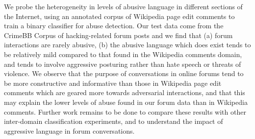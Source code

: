 We probe the heterogeneity in levels of abusive language in different sections of the Internet, using an annotated corpus of Wikipedia page edit comments to train a binary classifier for abuse detection. Our test data come from the CrimeBB Corpus of hacking-related forum posts and we find that (a) forum interactions are rarely abusive, (b) the abusive language which does exist tends to be relatively mild compared to that found in the Wikipedia comments domain, and tends to involve aggressive posturing rather than hate speech or threats of violence. We observe that the purpose of conversations in online forums tend to be more constructive and informative than those in Wikipedia page edit comments which are geared more towards adversarial interactions, and that this may explain the lower levels of abuse found in our forum data than in Wikipedia comments. Further work remains to be done to compare these results with other inter-domain classification experiments, and to understand the impact of aggressive language in forum conversations.
